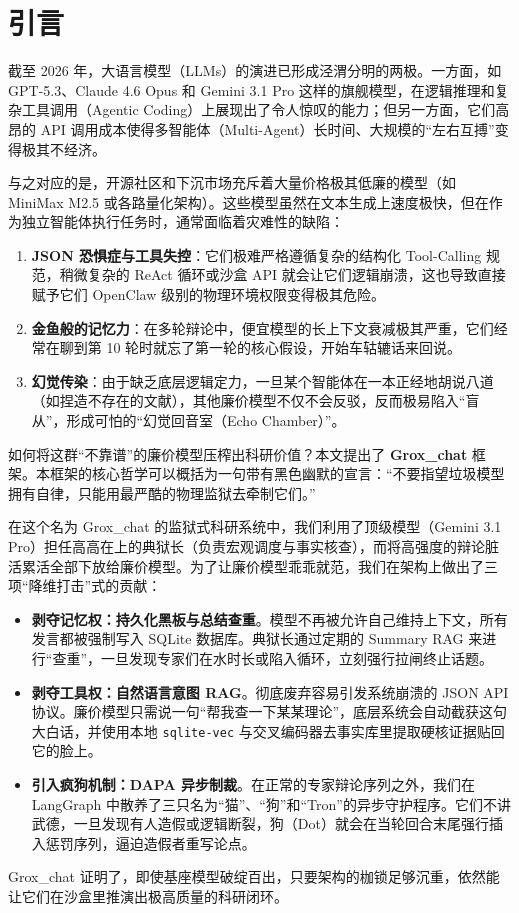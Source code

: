 \section{引言}
\label{sec:intro}

截至 2026 年，大语言模型（LLMs）的演进已形成泾渭分明的两极。一方面，如 GPT-5.3、Claude 4.6 Opus 和 Gemini 3.1 Pro 这样的旗舰模型，在逻辑推理和复杂工具调用（Agentic Coding）上展现出了令人惊叹的能力；但另一方面，它们高昂的 API 调用成本使得多智能体（Multi-Agent）长时间、大规模的“左右互搏”变得极其不经济。

与之对应的是，开源社区和下沉市场充斥着大量价格极其低廉的模型（如 MiniMax M2.5 或各路量化架构）。这些模型虽然在文本生成上速度极快，但在作为独立智能体执行任务时，通常面临着灾难性的缺陷：
\begin{enumerate}
    \item \textbf{JSON 恐惧症与工具失控}：它们极难严格遵循复杂的结构化 Tool-Calling 规范，稍微复杂的 ReAct 循环或沙盒 API 就会让它们逻辑崩溃，这也导致直接赋予它们 OpenClaw 级别的物理环境权限变得极其危险。
    \item \textbf{金鱼般的记忆力}：在多轮辩论中，便宜模型的长上下文衰减极其严重，它们经常在聊到第 10 轮时就忘了第一轮的核心假设，开始车轱辘话来回说。
    \item \textbf{幻觉传染}：由于缺乏底层逻辑定力，一旦某个智能体在一本正经地胡说八道（如捏造不存在的文献），其他廉价模型不仅不会反驳，反而极易陷入“盲从”，形成可怕的“幻觉回音室（Echo Chamber）”。
\end{enumerate}

如何将这群“不靠谱”的廉价模型压榨出科研价值？本文提出了 \textbf{Grox\_chat} 框架。本框架的核心哲学可以概括为一句带有黑色幽默的宣言：“不要指望垃圾模型拥有自律，只能用最严酷的物理监狱去牵制它们。”

在这个名为 Grox\_chat 的监狱式科研系统中，我们利用了顶级模型（Gemini 3.1 Pro）担任高高在上的典狱长（负责宏观调度与事实核查），而将高强度的辩论脏活累活全部下放给廉价模型。为了让廉价模型乖乖就范，我们在架构上做出了三项“降维打击”式的贡献：
\begin{itemize}
    \item \textbf{剥夺记忆权：持久化黑板与总结查重}。模型不再被允许自己维持上下文，所有发言都被强制写入 SQLite 数据库。典狱长通过定期的 Summary RAG 来进行“查重”，一旦发现专家们在水时长或陷入循环，立刻强行拉闸终止话题。
    \item \textbf{剥夺工具权：自然语言意图 RAG}。彻底废弃容易引发系统崩溃的 JSON API 协议。廉价模型只需说一句“帮我查一下某某理论”，底层系统会自动截获这句大白话，并使用本地 \texttt{sqlite-vec} 与交叉编码器去事实库里提取硬核证据贴回它的脸上。
    \item \textbf{引入疯狗机制：DAPA 异步制裁}。在正常的专家辩论序列之外，我们在 LangGraph 中散养了三只名为“猫”、“狗”和“Tron”的异步守护程序。它们不讲武德，一旦发现有人造假或逻辑断裂，狗（Dot）就会在当轮回合末尾强行插入惩罚序列，逼迫造假者重写论点。
\end{itemize}

Grox\_chat 证明了，即使基座模型破绽百出，只要架构的枷锁足够沉重，依然能让它们在沙盒里推演出极高质量的科研闭环。